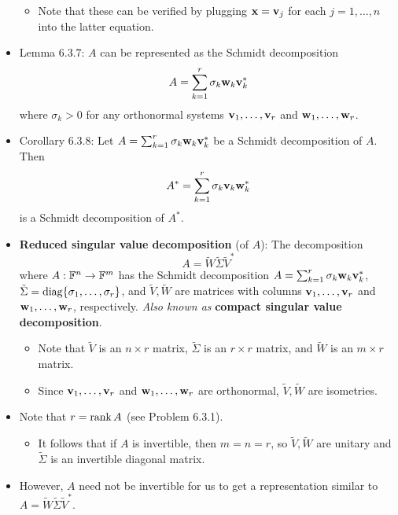 \documentclass[../../notes.tex]{subfiles}
\begin{document}
\begin{itemize}
    \begin{itemize}
        \item Note that these can be verified by plugging $\mathbf{x}=\mathbf{v}_j$ for each $j=1,\dots,n$ into the latter equation.
    \end{itemize}
    \item {}Lemma 6.3.7: $A$ can be represented as the Schmidt decomposition
    \begin{equation*}
        A = \sum_{k=1}^r\sigma_k\mathbf{w}_k\mathbf{v}_k^*
    \end{equation*}
    where $\sigma_k>0$ for any orthonormal systems $\mathbf{v}_1,\dots,\mathbf{v}_r$ and $\mathbf{w}_1,\dots,\mathbf{w}_r$.
    \item Corollary 6.3.8: Let $A=\sum_{k=1}^r\sigma_k\mathbf{w}_k\mathbf{v}_k^*$ be a Schmidt decomposition of $A$. Then
    \begin{equation*}
        A^* = \sum_{k=1}^r\sigma_k\mathbf{v}_k\mathbf{w}_k^*
    \end{equation*}
    is a Schmidt decomposition of $A^*$.
    \item \textbf{Reduced singular value decomposition} (of $A$): The decomposition
    \begin{equation*}
        A = \tilde{W}\tilde{\Sigma}\tilde{V}^*
    \end{equation*}
    where $A:\mathbb{F}^n\to\mathbb{F}^m$ has the Schmidt decomposition $A=\sum_{k=1}^r\sigma_k\mathbf{w}_k\mathbf{v}_k^*$, $\tilde{\Sigma}=\operatorname{diag}\{\sigma_1,\dots,\sigma_r\}$, and $\tilde{V},\tilde{W}$ are matrices with columns $\mathbf{v}_1,\dots,\mathbf{v}_r$ and $\mathbf{w}_1,\dots,\mathbf{w}_r$, respectively. \emph{Also known as} \textbf{compact singular value decomposition}.
    \begin{itemize}
        \item Note that $\tilde{V}$ is an $n\times r$ matrix, $\tilde{\Sigma}$ is an $r\times r$ matrix, and $\tilde{W}$ is an $m\times r$ matrix.
        \item Since $\mathbf{v}_1,\dots,\mathbf{v}_r$ and $\mathbf{w}_1,\dots,\mathbf{w}_r$ are orthonormal, $\tilde{V},\tilde{W}$ are isometries.
    \end{itemize}
    \item Note that $r=\rank A$ (see Problem 6.3.1).
    \begin{itemize}
        \item It follows that if $A$ is invertible, then $m=n=r$, so $\tilde{V},\tilde{W}$ are unitary and $\tilde{\Sigma}$ is an invertible diagonal matrix.
    \end{itemize}
    \item However, $A$ need not be invertible for us to get a representation similar to $A=\tilde{W}\tilde{\Sigma}\tilde{V}^*$.

\end{itemize}
\end{document}
